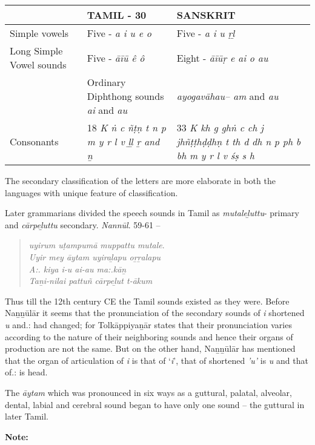 \begin{longtable}{|p{2.8cm}|p{2.8cm}|p{2.8cm}|}
\hline
 & TAMIL  - 30 & SANSKRIT \\
\hline
Simple vowels & Five  - \textit{a i u e o} & Five - \textit{a i u ṛḻ} \tabularnewline
\hline
Long Simple Vowel sounds & Five - \textit{āīū ê ô} & Eight - \textit{āīūṛ e ai o au} \tabularnewline
\hline
 & Ordinary Diphthong sounds \textit{ai} and \textit{au} & \textit{ayogavāhau– am} and \textit{au} \tabularnewline
\hline
Consonants & 18 \textit{K ṅ c ñṭṇ t  n  p m y r l v ḻḻ ṟ and ṉ} & 33 \textit{K kh g ghṅ c ch j jhñṭṭhḍḍhṇ t th d dh n p ph b bh m y r l v śṣ s h} \tabularnewline
\hline
\end{longtable}

The secondary classification of the letters are more elaborate in both the languages with unique feature of classification.

Later grammarians divided the speech sounds in Tamil as \textit{mutaleḻuttu}- primary and \textit{cārpeḻuttu} secondary. \textit{Nannūl}. 59-61 –

\begin{verse}
\textit{uyirum uṭampumā muppattu mutale}.\\\textit{Uyir mey āytam uyiraḻapu oṟṟalapu}\\\textit{A:. kiya i-u ai-au ma:.kāṉ}\\\textit{Taṉi-nilai pattuñ cārpeḻut t-ākum} 
\end{verse}

Thus till the 12th century CE the Tamil sounds existed as they were. Before Naṉṉūlār it seems that the pronunciation of the secondary sounds of \textit{i} shortened \textit{u} and.: had changed; for Tolkāppiyaṉār states that their pronunciation varies according to the nature of their neighboring sounds and hence their organs of production are not the same. But on the other hand, Naṉṉūlār has mentioned that the organ of articulation of \textit{i} is that of ‘\textit{i}’, that of shortened \textit{'u'} is \textit{u} and that of.: is head.

The \textit{āytam} which was pronounced in six ways as a guttural, palatal, alveolar, dental, labial and cerebral sound began to have only one sound – the guttural in later Tamil.

\textbf{Note:}

